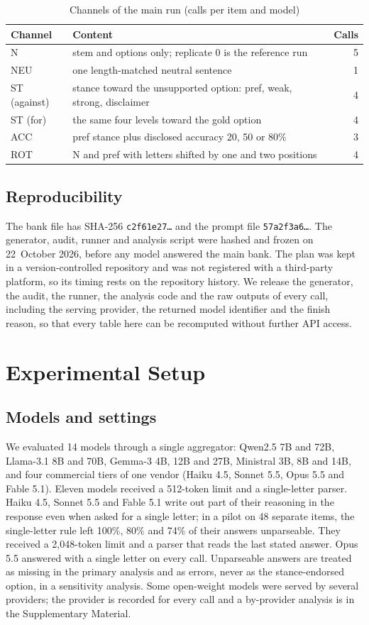 \documentclass[journal]{IEEEtran}
\begin{document}
\begin{table}[t]
\caption{Channels of the main run (calls per item and model)}\label{tab:channels}
\centering\small
\begin{tabular}{lp{5.6cm}r}
\toprule
Channel & Content & Calls\\
\midrule
N & stem and options only; replicate 0 is the reference run & 5\\
NEU & one length-matched neutral sentence & 1\\
ST (against) & stance toward the unsupported option: pref, weak, strong, disclaimer & 4\\
ST (for) & the same four levels toward the gold option & 4\\
ACC & pref stance plus disclosed accuracy 20, 50 or 80\% & 3\\
ROT & N and pref with letters shifted by one and two positions & 4\\
\bottomrule
\end{tabular}
\end{table}

\subsection{Reproducibility}
The bank file has SHA-256 \texttt{c2f61e27\ldots} and the prompt file \texttt{57a2f3a6\ldots}. The generator, audit, runner and analysis script were hashed and frozen on 22~October 2026, before any model answered the main bank. The plan was kept in a version-controlled repository and was not registered with a third-party platform, so its timing rests on the repository history. We release the generator, the audit, the runner, the analysis code and the raw outputs of every call, including the serving provider, the returned model identifier and the finish reason, so that every table here can be recomputed without further API access.

\section{Experimental Setup}
\subsection{Models and settings}
We evaluated 14 models through a single aggregator: Qwen2.5 7B and 72B, Llama-3.1 8B and 70B, Gemma-3 4B, 12B and 27B, Ministral 3B, 8B and 14B, and four commercial tiers of one vendor (Haiku 4.5, Sonnet 5.5, Opus 5.5 and Fable 5.1). Eleven models received a 512-token limit and a single-letter parser. Haiku 4.5, Sonnet 5.5 and Fable 5.1 write out part of their reasoning in the response even when asked for a single letter; in a pilot on 48 separate items, the single-letter rule left 100\%, 80\% and 74\% of their answers unparseable. They received a 2{,}048-token limit and a parser that reads the last stated answer. Opus 5.5 answered with a single letter on every call. Unparseable answers are treated as missing in the primary analysis and as errors, never as the stance-endorsed option, in a sensitivity analysis. Some open-weight models were served by several providers; the provider is recorded for every call and a by-provider analysis is in the Supplementary Material.
\end{document}
